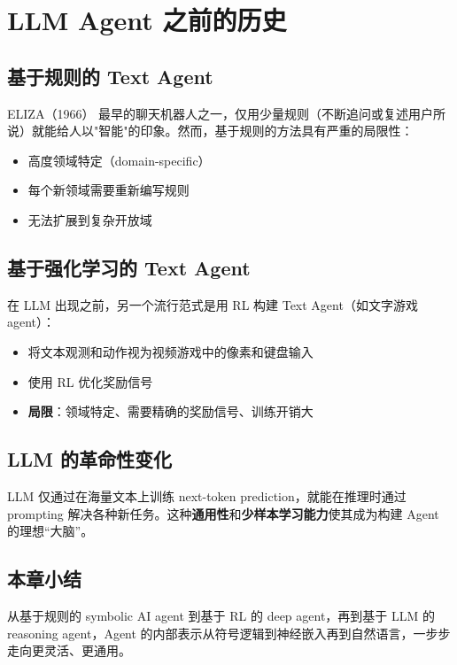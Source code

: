 \section{LLM Agent 之前的历史}

\subsection{基于规则的 Text Agent}

\begin{knowledgebox}{ELIZA（1966）}
最早的聊天机器人之一，仅用少量规则（不断追问或复述用户所说）就能给人以"智能"的印象。然而，基于规则的方法具有严重的局限性：
\begin{itemize}
    \item 高度领域特定（domain-specific）
    \item 每个新领域需要重新编写规则
    \item 无法扩展到复杂开放域
\end{itemize}
\end{knowledgebox}

\subsection{基于强化学习的 Text Agent}

在 LLM 出现之前，另一个流行范式是用 RL 构建 Text Agent（如文字游戏 agent）：

\begin{itemize}
    \item 将文本观测和动作视为视频游戏中的像素和键盘输入
    \item 使用 RL 优化奖励信号
    \item \textbf{局限}：领域特定、需要精确的奖励信号、训练开销大
\end{itemize}

\subsection{LLM 的革命性变化}

LLM 仅通过在海量文本上训练 next-token prediction，就能在推理时通过 prompting 解决各种新任务。这种\textbf{通用性}和\textbf{少样本学习能力}使其成为构建 Agent 的理想``大脑''。

\subsection{本章小结}

从基于规则的 symbolic AI agent 到基于 RL 的 deep agent，再到基于 LLM 的 reasoning agent，Agent 的内部表示从符号逻辑到神经嵌入再到自然语言，一步步走向更灵活、更通用。

